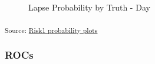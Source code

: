 \documentclass[
  letterpaper,
  DIV=11,
  numbers=noendperiod]{scrartcl}
\begin{document}
\begin{figure}[H]


\caption{\label{fig-day-high_dec_thres}Lapse Probability by Truth - Day}

\end{figure}%

\textsubscript{Source:
\href{https://jjcurtin.github.io/lectures_science/notebooks/ema_figs_probability-preview.html\#cell-fig-day-high_dec_thres}{Risk1
probability plots}}

\subsubsection{ROCs}\label{rocs}
\end{document}
